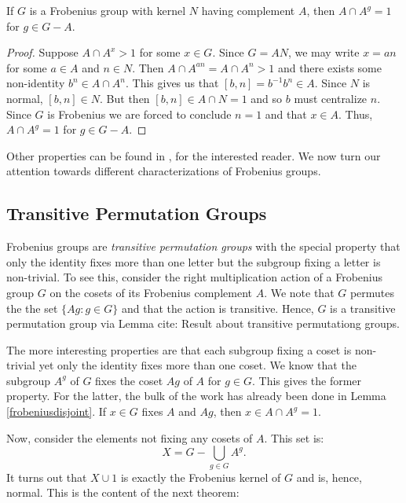 \documentclass[main.tex]{subfiles}
\begin{document}
\begin{lemma}\label{frobeniusdisjoint}
If $G$ is a Frobenius group with kernel $N$ having complement $A$, then $A \cap A^g = 1$ for $g \in G - A$.
\end{lemma}

\begin{proof}
Suppose $A \cap A^x > 1$ for some $x \in G$. Since $G = AN$, we may write $x = an$ for some $a \in A$ and $n \in N$. Then $A \cap A^{an} = A \cap A^n > 1$ and there exists some non-identity $b^n \in A \cap A^n$. This gives us that $[b,n] = b^{-1}b^n \in A$. Since $N$ is normal, $[b, n] \in N$. But then $[b,n] \in A \cap N = 1$ and so $b$ must centralize $n$. Since $G$ is Frobenius we are forced to conclude $n = 1$ and that $x \in A$. Thus, $A \cap A^g = 1$ for $g \in G - A$.
\end{proof}

Other properties can be found in \cite{isaacsfinitegrouptheory}, \cite{gorensteinfinitegroups} for the interested reader. We now turn our attention towards different characterizations of Frobenius groups.

\hss

\subsection{Transitive Permutation Groups}

\hss

Frobenius groups are \emph{transitive permutation groups} with the special property that only the identity fixes more than one letter but the subgroup fixing a letter is non-trivial. To see this, consider the right multiplication action of a Frobenius group $G$ on the cosets of its Frobenius complement $A$. We note that $G$ permutes the the set $\{Ag : g \in G \}$ and that the action is transitive. Hence, $G$ is a transitive permutation group via Lemma cite: Result about transitive permutationg groups.

The more interesting properties are that each subgroup fixing a coset is non-trivial yet only the identity fixes more than one coset. We know that the subgroup $A^g$ of $G$ fixes the coset $Ag$ of $A$ for $g \in G$. This gives the former property. For the latter, the bulk of the work has already been done in Lemma \ref{frobeniusdisjoint}. If $x \in G$ fixes $A$ and $Ag$, then $x \in A \cap A^g = 1$.

Now, consider the elements not fixing any cosets of $A$. This set is:
$$X = G - \bigcup_{g \in G} A^g\text{.}$$
It turns out that $X \cup {1}$ is exactly the Frobenius kernel of $G$ and is, hence, normal. This is the content of the next theorem:
\end{document}
